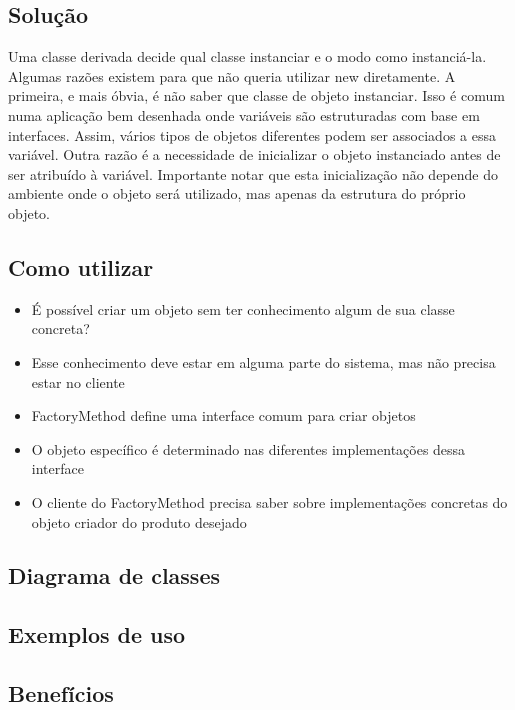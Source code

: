 \subsection{Solução}
\label{sub:fac_solucao}

Uma classe derivada decide qual classe instanciar e o modo como instanciá-la.
Algumas razões existem para que não queria utilizar new diretamente. A primeira, e
mais óbvia, é não saber que classe de objeto instanciar.
Isso é comum numa aplicação bem desenhada onde variáveis são estruturadas com
base em interfaces. Assim, vários tipos de objetos diferentes podem ser associados a
essa variável. Outra razão é a necessidade de inicializar o objeto instanciado antes de ser
atribuído à variável. Importante notar
que esta inicialização não depende do ambiente onde o objeto será utilizado, mas apenas
da estrutura do próprio objeto.



\subsection{Como utilizar}
\label{sub:fac_utilizacao}

\begin{itemize}
	\item É possível criar um objeto sem ter conhecimento algum de sua classe concreta?
	\item Esse conhecimento deve estar em alguma parte do sistema, mas não precisa estar
no cliente
	\item FactoryMethod define uma interface comum para criar objetos
	\item O objeto específico é determinado nas diferentes implementações dessa interface
	\item O cliente do FactoryMethod precisa saber sobre implementações concretas do
objeto criador do produto desejado

\end{itemize}


\subsection{Diagrama de classes}
\label{sub:fac_diagrama}




\subsection{Exemplos de uso}
\label{sub:fac_uso}

\subsection{Benefícios}
\label{sub:fac_beneficios}




